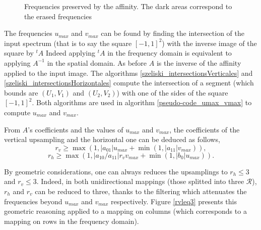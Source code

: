\begin{figure}
		\caption{Frequencies preserved by the affinity. The dark areas correspond to the erased frequencies}
		\label{uMax_vMax}
		\end{figure}
		
 
		 The frequencies $u_{max}$ and $v_{max}$ can be found by finding the intersection of the input spectrum (that is to say the square $[-1,1]^2$) with the inverse image of the square by $^t\!A$ Indeed applying $^t\!A$ in the frequency domain is equivalent to applying $A^{-1}$ in the spatial domain. As before $A$ is the inverse of the affinity applied to the input image. The algorithms \ref{szeliski_intersectionsVerticales} and \ref{szeliski_intersectionsHorizontales} compute the intersection of a segment (which bounds are $(U_1,V_1)$ and $(U_2,V_2)$) with one of the sides of the square $[-1,1]^2$. Both algorithms are used in algorithm \ref{pseudo-code_umax_vmax} to compute $u_{max}$ and $v_{max}$.


		
		From $A$'s coefficients and the values of $u_{max}$ and $v_{max}$, the coefficients of the vertical upsampling and the horizontal one can be deduced \cite{szeliski2010high} as follows,
		\[r_v \geq \max (1,|a_{01}|u_{max}+\min (1,|a_{11}|v_{max})),\]
		\[r_h \geq \max (1,|a_{10}/a_{11}|r_vv_{max}+\min (1,|b_0|u_{max})).\]


\noindent		By geometric considerations, one can always reduces the upsamplings to $r_h \leq 3$ and $r_v \leq 3$. Indeed, in both unidirectional mappings (those splitted into three $\mathcal R$), $r_h$ and $r_v$ can be reduced to three, thanks to the filtering which attenuates the frequencies beyond $u_{max}$ and $v_{max}$ respectively. Figure \ref{rvleq3} presents this geometric reasoning applied to a mapping on columns (which corresponds to a mapping on rows in the frequency domain).

